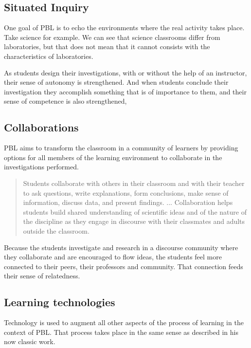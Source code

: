 \subsection{Situated Inquiry}

One goal of PBL is to echo the environments where the real activity takes place.
Take science for example. We can see that science classrooms differ from
laboratories, but that does not mean that it cannot consists with the
characteristics of laboratories. 

As students design their investigations, with or without the help of an
instructor, their sense of autonomy is strengthened. And when students conclude
their investigation they accomplish something that is of importance to them, and
their sense of competence is also strengthened,


\subsection{Collaborations}

PBL aims to transform the classroom in a community of learners by providing
options for all members of the learning environment to collaborate in the
investigations performed. 

\begin{quotation}
Students collaborate with others in their classroom and with their teacher to ask
questions, write explanations, form conclusions, make sense of information,
discuss data, and present findings.
...
Collaboration helps students build shared understanding of scientific ideas and
of the nature of the discipline as they engage in discourse with their
classmates and adults outside the classroom.
\cite{education:joseph_phyllis__pbl}
\end{quotation}

Because the students investigate and research in a discourse community where
they collaborate and are encouraged to flow ideas, the students feel more
connected to their peers, their professors and community. That connection feeds
their sense of relatedness.

\subsection{Learning technologies}

Technology is used to augment all other aspects of the process of learning in
the context of PBL. That process takes place in the same sense as
\cite{intelligence:engelbart__augmenting} described in his now classic work. 

